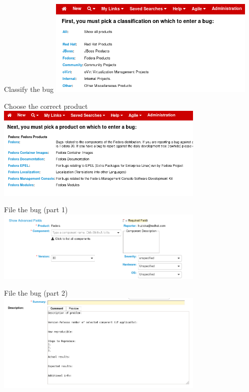 \documentclass[12pt]{beamer}
\begin{document}
\begin{frame}{Classify the bug}
\includegraphics[width=10cm]{images/bz_classification.png}
\end{frame}

\begin{frame}{Choose the correct product}
\includegraphics[width=10cm]{images/bz_product.png}
\end{frame}

\begin{frame}{File the bug (part 1)}
\includegraphics[width=10cm]{images/bz_header.png}
\end{frame}

\begin{frame}{File the bug (part 2)}
\includegraphics[width=10cm]{images/bz_description.png}
\end{frame}
\end{document}

